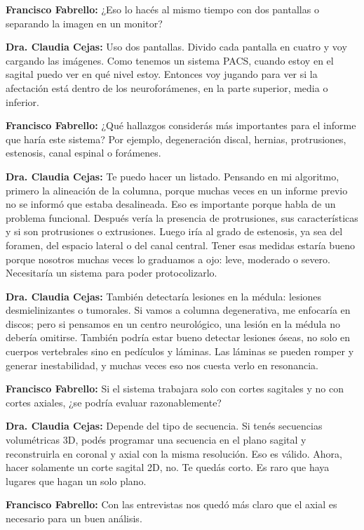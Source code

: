 \noindent\textbf{Francisco Fabrello:} ¿Eso lo hacés al mismo tiempo con dos pantallas o separando la imagen en un monitor?

\noindent\textbf{Dra. Claudia Cejas:} Uso dos pantallas. Divido cada pantalla en cuatro y voy cargando las imágenes. Como tenemos un sistema PACS, cuando estoy en el sagital puedo ver en qué nivel estoy. Entonces voy jugando para ver si la afectación está dentro de los neuroforámenes, en la parte superior, media o inferior.

\noindent\textbf{Francisco Fabrello:} ¿Qué hallazgos considerás más importantes para el informe que haría este sistema? Por ejemplo, degeneración discal, hernias, protrusiones, estenosis, canal espinal o forámenes.

\noindent\textbf{Dra. Claudia Cejas:} Te puedo hacer un listado. Pensando en mi algoritmo, primero la alineación de la columna, porque muchas veces en un informe previo no se informó que estaba desalineada. Eso es importante porque habla de un problema funcional. Después vería la presencia de protrusiones, sus características y si son protrusiones o extrusiones. Luego iría al grado de estenosis, ya sea del foramen, del espacio lateral o del canal central. Tener esas medidas estaría bueno porque nosotros muchas veces lo graduamos a ojo: leve, moderado o severo. Necesitaría un sistema para poder protocolizarlo.

\noindent\textbf{Dra. Claudia Cejas:} También detectaría lesiones en la médula: lesiones desmielinizantes o tumorales. Si vamos a columna degenerativa, me enfocaría en discos; pero si pensamos en un centro neurológico, una lesión en la médula no debería omitirse. También podría estar bueno detectar lesiones óseas, no solo en cuerpos vertebrales sino en pedículos y láminas. Las láminas se pueden romper y generar inestabilidad, y muchas veces eso nos cuesta verlo en resonancia.

\noindent\textbf{Francisco Fabrello:} Si el sistema trabajara solo con cortes sagitales y no con cortes axiales, ¿se podría evaluar razonablemente?

\noindent\textbf{Dra. Claudia Cejas:} Depende del tipo de secuencia. Si tenés secuencias volumétricas 3D, podés programar una secuencia en el plano sagital y reconstruirla en coronal y axial con la misma resolución. Eso es válido. Ahora, hacer solamente un corte sagital 2D, no. Te quedás corto. Es raro que haya lugares que hagan un solo plano.

\noindent\textbf{Francisco Fabrello:} Con las entrevistas nos quedó más claro que el axial es necesario para un buen análisis.

